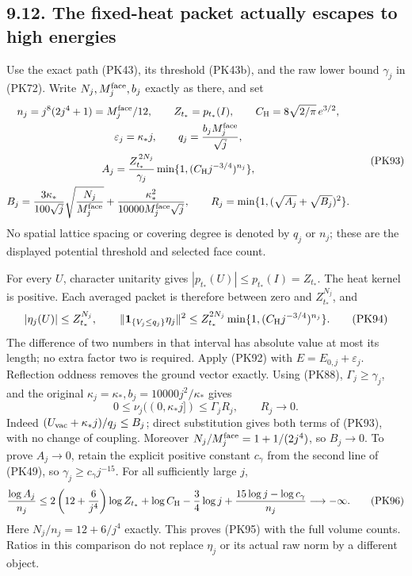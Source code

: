 \documentclass[11pt]{article}
\begin{document}
\subsection*{9.12. The fixed-heat packet actually escapes to high energies}

Use the exact path (PK43), its threshold (PK43b), and the raw lower
bound \(\gamma_j\) in (PK72). Write \(N_j,M_j^{\rm face},b_j\)
exactly as there, and set
\[
 \begin{gathered}
 n_j=j^8(2j^4+1)=M_j^{\rm face}/12,\qquad
 Z_{t_*}=p_{t_*}(I),\qquad
 C_{\rm H}=8\sqrt{2/\pi}\,e^{3/2},\\
 \varepsilon_j=\kappa_*j,\qquad
 q_j=\frac{b_jM_j^{\rm face}}{\sqrt j},\\
 A_j=\frac{Z_{t_*}^{\,2N_j}}{\gamma_j}
          \min\{1,(C_{\rm H}j^{-3/4})^{n_j}\},\\
 B_j=\frac{3\kappa_*}{100\sqrt j}
              \sqrt{\frac{N_j}{M_j^{\rm face}}}
       +\frac{\kappa_*^2}{10000M_j^{\rm face}\sqrt j},\qquad
 R_j=\min\{1,(\sqrt{A_j}+\sqrt{B_j})^2\}.
 \end{gathered}\tag{PK93}
\]
No spatial lattice spacing or covering degree is denoted by \(q_j\)
or \(n_j\); these are the displayed potential threshold and selected
face count.

For every \(U\), character unitarity gives
\(|p_{t_*}(U)|\le p_{t_*}(I)=Z_{t_*}\).
The heat kernel is positive. Each averaged packet is therefore between
zero and \(Z_{t_*}^{N_j}\), and
\[
 |\eta_j(U)|\le Z_{t_*}^{N_j},\qquad
 \|\mathbf1_{\{V_j\le q_j\}}\eta_j\|^2
 \le Z_{t_*}^{2N_j}
       \min\{1,(C_{\rm H}j^{-3/4})^{n_j}\}.
 \tag{PK94}
\]
The difference of two numbers in that interval has absolute value at
most its length; no extra factor two is required.
Apply (PK92) with \(E=E_{0,j}+\varepsilon_j\).
Reflection oddness removes the ground vector exactly. Using (PK88),
\(\Gamma_j\ge\gamma_j\), and the original
\(\kappa_j=\kappa_*,b_j=10000j^2/\kappa_*\) gives
\[
 0\le\nu_j((0,\kappa_*j])\le\Gamma_jR_j,\qquad
 R_j\longrightarrow0 .
 \tag{PK95}
\]
Indeed \((U_{\rm vac}+\kappa_*j)/q_j\le B_j\); direct substitution
gives both terms of (PK93), with no change of coupling.
Moreover \(N_j/M_j^{\rm face}=1+1/(2j^4)\), so \(B_j\to0\).
To prove \(A_j\to0\), retain the explicit positive constant \(c_\gamma\)
from the second line of (PK49), so \(\gamma_j\ge c_\gamma j^{-15}\).
For all sufficiently large \(j\),
\[
 \frac{\log A_j}{n_j}
 \le 2\left(12+\frac6{j^4}\right)\log Z_{t_*}
       +\log C_{\rm H}-\frac34\log j
       +\frac{15\log j-\log c_\gamma}{n_j}
 \longrightarrow-\infty .
 \tag{PK96}
\]
Here \(N_j/n_j=12+6/j^4\) exactly. This proves (PK95) with the full
volume counts. Ratios in this comparison do not replace \(\eta_j\)
or its actual raw norm by a different object.
\end{document}
